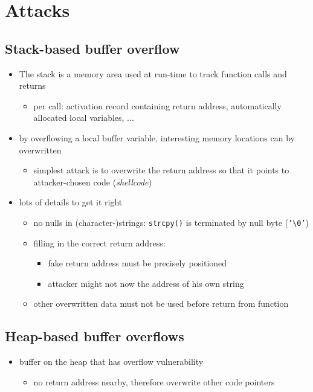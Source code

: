 \documentclass[12pt,titlepage,a4paper]{report}
\begin{document}
	\section{Attacks}
	\subsection{Stack-based buffer overflow}
	\begin{itemize}
		\item The stack is a memory area used at run-time to track function calls and returns
		\begin{itemize}
			\item per call: activation record containing return address, automatically allocated local variables, ...
		\end{itemize}
		\item by overflowing a local buffer variable, interesting memory locations can by overwritten
		\begin{itemize}
			\item simplest attack is to overwrite the return address so that it points to attacker-chosen code (\emph{shellcode})
		\end{itemize}
		\item lots of details to get it right
		\begin{itemize}
			\item no nulls in (character-)strings: {\texttt{strcpy()} is terminated by null byte (\texttt{'\textbackslash0'})}
			\item filling in the correct return address:
			\begin{itemize}
				\item fake return address must be precisely positioned
				\item attacker might not now the address of his own string
			\end{itemize}
			\item other overwritten data must not be used before return from function
		\end{itemize}
	\end{itemize}

	\subsection{Heap-based buffer overflows}
	\begin{itemize}
		\item buffer on the heap that has overflow vulnerability
		\begin{itemize}
			\item no return address nearby, therefore overwrite other code pointers
		\end{itemize}
	\end{itemize}
	
\end{document}
